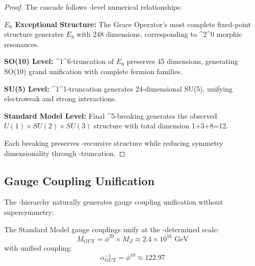 \begin{proof}
The cascade follows \phi-level numerical relationships:

\textbf{$E_8$ Exceptional Structure:} The Grace Operator's most complete fixed-point structure generates $E_8$ with 248 dimensions, corresponding to \phi^2^0  morphic resonances.

\textbf{SO(10) Level:} \phi^1^6-truncation of $E_8$ preserves 45 dimensions, generating SO(10) grand unification with complete fermion families.

\textbf{SU(5) Level:} \phi^1^1-truncation generates 24-dimensional SU(5), unifying electroweak and strong interactions.

\textbf{Standard Model Level:} Final \phi^5-breaking generates the observed $U(1) \times SU(2) \times SU(3)$ structure with total dimension 1+3+8=12.

Each breaking preserves \phi-recursive structure while reducing symmetry dimensionality through -truncation.
\end{proof}

\subsection{Gauge Coupling Unification}

The \phi-hierarchy naturally generates gauge coupling unification without supersymmetry:

\begin{theorem}
The Standard Model gauge couplings unify at the \phi-determined scale:
\begin{equation}
M_{\text{GUT}} = \phi^{20} \times M_Z \approx 2.4 \times 10^{16} \text{ GeV}
\label{eq:phi_gut_scale}
\end{equation}
with unified coupling:
\begin{equation}
\alpha_{\text{GUT}}^{-1} = \phi^{10} \approx 122.97
\label{eq:phi_unified_coupling}
\end{equation}
\end{theorem}

